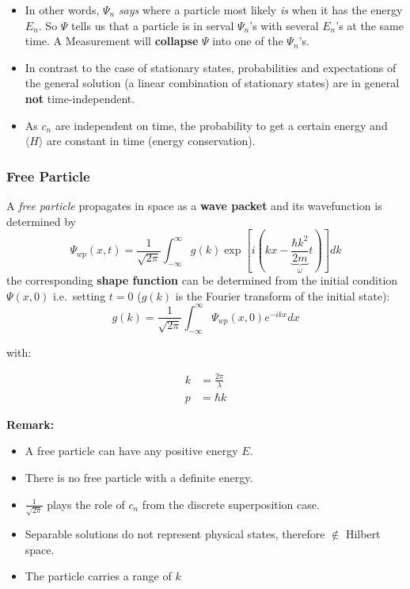 \begin{itemize}
    \item In other words, $\Psi_n$ \textit{says} where a particle most likely \textit{is} when it has the energy $E_n$. So $\Psi$ tells us that a particle is in serval $\Psi_n$'s with several $E_n$'s at the same time. A Measurement will \textbf{collapse} $\Psi$ into one of the $\Psi_n$'s.
    \item In contrast to the case of stationary states, probabilities and expectations of the general solution (a linear combination of stationary states) are in general \textbf{not} time-independent.
    \item As $c_n$ are independent on time, the probability to get a certain energy and $\langle H\rangle$ are constant in time (energy conservation).
\end{itemize}
\subsubsection{Free Particle}
A \textit{free particle} propagates in space as a \textbf{wave packet} and its wavefunction is determined by
\noindent\begin{equation*}
    \Psi_{wp}(x,t)=\frac{1}{\sqrt{2\pi}}\int_{-\infty}^{\infty}g(k)\exp\left[i\left(kx- \underbrace{\frac{\hbar k^{2}}{2m}}_{\omega}t\right)\right]dk
\end{equation*}
the corresponding \textbf{shape function} can be determined from the initial condition $\Psi(x,0)$ i.e.\ setting $t=0$ ($g(k)$ is the Fourier transform of the initial state):
\noindent\begin{equation*}
    g(k)=\frac{1}{\sqrt{2\pi}}\int_{-\infty}^{\infty}\Psi_{wp}(x,0)e^{-ikx}dx
\end{equation*}

with:

\begin{align*}
    k & = \frac{2\pi}{\lambda} \\
    p & = \hbar k
\end{align*}

\textbf{Remark:}

\begin{itemize}
    \item A free particle can have any positive energy $E$.
    \item There is no free particle with a definite energy.
    \item $\frac{1}{\sqrt{2\pi}}$ plays the role of $c_n$ from the discrete superposition case.
    \item Separable solutions do not represent physical states, therefore $\notin$ Hilbert space.
    \item The particle carries a range of $k$
\end{itemize}

